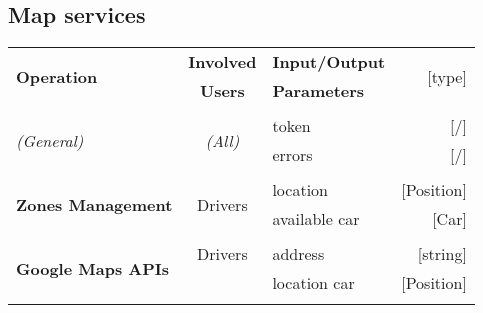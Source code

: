 \subsection{Map services}
	\begin{center}
		\begin{tabular}{ l | c | l   r }
			\multirow{2}{*}{\textbf{Operation}} & \textbf{Involved} & \textbf{Input/Output} & \multirow{2}{*}{[type]}\\
			& \textbf{Users} & \textbf{Parameters} & \\ [1.5ex]
			\hline\hline\\
			
			\multirow{2}{*}{\textit{(General)}}
				& \multirow{2}{*}{\textit{(All)}}
					&	token & [/]\\
					&&	errors & [/]\\ [1.5ex]
			\hline\\
			
			\multirow{2}{*}{\textbf{Zones Management}}
				& \multirow{2}{*}{Drivers}
					&	location & [Position]\\
					&&	available car & [Car]\\ [1.5ex]
			\hline\\
			
			\multirow{2}{*}{\textbf{Google Maps APIs}}
				& \multirow{1}{*}{Drivers}
					&	address & [string]\\
					&&	location car & [Position]\\ [1.5ex]
			\hline\\
			
		\end{tabular}
	\end{center}
	
